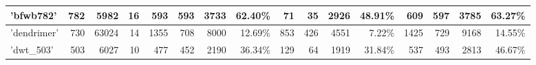 \begin{table}[]
{\begin{tabular}{|l|r|r|r|r|r|r|r|r|r|r|r|r|r|r|r|}
\hline
'bfwb782'                     & 782                                                     & 5982                                                & 16                                                       & 593                     & 593                     & 3733                                                                          & 62.40\%                                                                          & 71                      & 35                      & 2926                                                                           & 48.91\%                                                                          & 609                     & 597                     & 3785                                                                           & 63.27\%                                                                           \\ 
\hline
'dendrimer'                   & 730                                                     & 63024                                               & 14                                                       & 1355                    & 708                     & 8000                                                                          & 12.69\%                                                                          & 853                     & 426                     & 4551                                                                           & 7.22\%                                                                           & 1425                    & 729                     & 9168                                                                           & 14.55\%                                                                           \\ 
\hline
'dwt\_503'                    & 503                                                     & 6027                                                & 10                                                       & 477                     & 452                     & 2190                                                                          & 36.34\%                                                                          & 129                     & 64                      & 1919                                                                           & 31.84\%                                                                          & 537                     & 493                     & 2813                                                                           & 46.67\%                                                                           \\ 

\end{tabular}}
\end{table}
